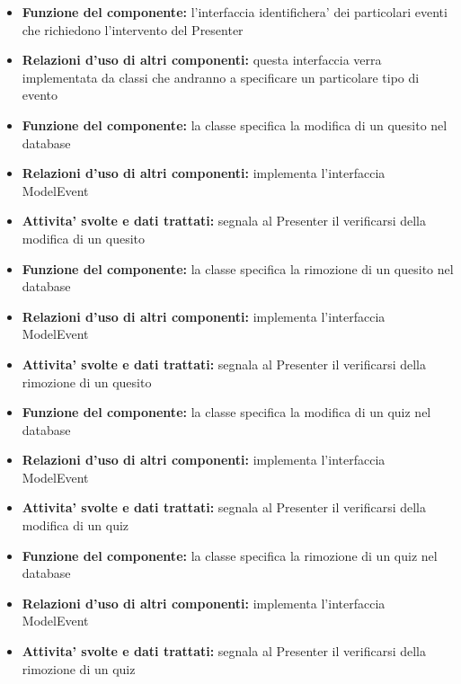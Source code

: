 \rigaregistro{0.0.17}{Luca Alessio (Progettista)}{12/05/2016}{Termine stesura sezione diagrammi e revisione/ampliamento di vari paragrafi}\documentclass[a4paper,11pt]{article}
\begin{document}
			\begin{itemize}
		    	\item\textbf{Funzione del componente:} l'interfaccia identifichera' dei particolari eventi che richiedono l'intervento del Presenter
			\item\textbf{Relazioni d'uso di altri componenti:} questa interfaccia verra implementata da classi che andranno a specificare un particolare tipo di evento
			\end{itemize}
			\begin{itemize}
		    	\item\textbf{Funzione del componente:} la classe specifica la modifica di un quesito nel database
				\item\textbf{Relazioni d'uso di altri componenti:} implementa l'interfaccia ModelEvent
				\item\textbf{Attivita' svolte e dati trattati:} segnala al Presenter il verificarsi della modifica di un quesito
			\end{itemize}
			\begin{itemize}
		    	\item\textbf{Funzione del componente:} la classe specifica la rimozione di un quesito nel database
				\item\textbf{Relazioni d'uso di altri componenti:} implementa l'interfaccia ModelEvent
				\item\textbf{Attivita' svolte e dati trattati:} segnala al Presenter il verificarsi della rimozione di un quesito
			\end{itemize}
			\begin{itemize}
		    	\item\textbf{Funzione del componente:} la classe specifica la modifica di un quiz nel database
				\item\textbf{Relazioni d'uso di altri componenti:} implementa l'interfaccia ModelEvent
				\item\textbf{Attivita' svolte e dati trattati:} segnala al Presenter il verificarsi della modifica di un quiz
			\end{itemize}
			\begin{itemize}
		    	\item\textbf{Funzione del componente:} la classe specifica la rimozione di un quiz nel database
				\item\textbf{Relazioni d'uso di altri componenti:} implementa l'interfaccia ModelEvent
				\item\textbf{Attivita' svolte e dati trattati:} segnala al Presenter il verificarsi della rimozione di un quiz
			\end{itemize}
\end{document}
